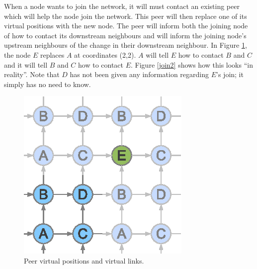 \documentclass[ %
                    author={Luke Murray},
                supervisor={Dr. Simon Hollis},
                     title={Shadow Peer-to-Peer Networks},
                  subtitle={},
                    degree={MEng},
                      year={2013} ]{thesis}
\begin{document}
When a node wants to join the network, it will must contact an existing peer which will help the node join the network. This peer will then replace one of its virtual positions with the new node. The peer will inform both the joining node of how to contact its downstream neighbours and will inform the joining node's upstream neighbours of the change in their downstream neighbour. In Figure \ref{join1}, the node $E$ replaces $A$ at coordinates (2,2). $A$ will tell $E$ how to contact $B$ and $C$ and it will tell $B$ and $C$ how to contact $E$. Figure \ref{join2} shows how this looks ``in reality''. Note that $D$ has not been given any information regarding $E$'s join; it simply has no need to know.

\begin{figure}[h]%
    \centering
    \begin{minipage}[b]{0.35\linewidth}
        \centering
        \includegraphics[width=\linewidth]{diagrams/network_join1.eps}
        \caption{Peer virtual positions and virtual links.}
        \label{join1}
    \end{minipage}
    \hspace{0.5cm}
    \begin{minipage}[b]{0.35\linewidth}
        \centering

\end{minipage}
\end{figure}
\end{document}
